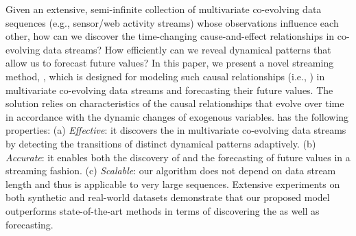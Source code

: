 Given an extensive,
semi-infinite collection of multivariate co-evolving data sequences
(e.g., sensor/web activity streams)
whose observations influence each other,
how can we discover the time-changing cause-and-effect relationships in co-evolving data streams?
How efficiently can we reveal dynamical patterns that allow us to forecast future values?
In this paper,
we present a novel streaming method, \method,
which is designed for modeling such causal relationships (i.e., \relation)
in multivariate co-evolving data streams
and forecasting their future values.
The solution relies on characteristics of the causal relationships that evolve over time in accordance with the dynamic changes of exogenous variables.
\method has the following properties: 
(a) \textit{Effective}:
it discovers the \relation in multivariate co-evolving data streams by detecting the transitions of distinct dynamical patterns adaptively.
(b) \textit{Accurate}: it enables both the discovery of \relation and the forecasting of future values in a streaming fashion.
(c) \textit{Scalable}:
our algorithm does not depend on data stream length
and thus is applicable to very large sequences.
Extensive experiments on both synthetic and real-world datasets demonstrate that our proposed model outperforms state-of-the-art methods in terms of discovering the \relation as well as forecasting.
